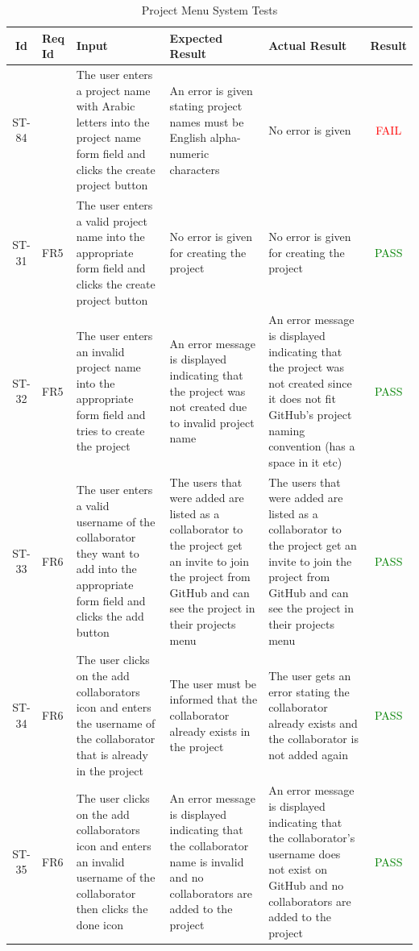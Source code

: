 \documentclass[12pt, titlepage]{article}
\begin{document}
	\begin{center}
		\begin{longtable}{|c|p{1cm}|p{2.7cm}|p{3cm}|p{3cm}|c|}
			\caption{Project Menu System Tests \label{long}}\\
			\hline
			\textbf{Id} & \textbf{Req Id} & \textbf{Input} & \textbf{Expected Result} & \textbf{Actual Result} & \textbf{Result}   \\
			\hline
			ST-84 & & The user enters a project name with Arabic letters into the project name form field and clicks the create project button & An error is given stating project names must be English alpha-numeric characters & No error is given &  \textcolor{red}{FAIL} \\
			\hline
			ST-31 & FR5 & The user enters a valid project name into the appropriate form field and clicks the create project button & No error is given for creating the project & No error is given for creating the project &  \textcolor{green}{PASS} \\
			\hline
			ST-32 & FR5 & The user enters an invalid project name into the appropriate form field and tries to create the project & An error message is displayed indicating that the project was not created due to invalid project name & An error message is displayed indicating that the project was not created since it does not fit GitHub's project naming convention (has a space in it etc) &  \textcolor{green}{PASS} \\
			\hline
			ST-33 & FR6 & The user enters a valid username of the collaborator they want to add into the appropriate form field and clicks the add button & The users that were added are listed as a collaborator to the project get an invite to join the project from GitHub and can see the project in their projects menu & The users that were added are listed as a collaborator to the project get an invite to join the project from GitHub and can see the project in their projects menu & \textcolor{green}{PASS} \\
			\hline
			ST-34 & FR6 &  The user clicks on the add collaborators icon and enters the username of the collaborator that is already in the project & The user must be informed that the collaborator already exists in the project & The user gets an error stating the collaborator already exists and the collaborator is not added again & \textcolor{green}{PASS} \\
			\hline
			ST-35 & FR6 & The user clicks on the add collaborators icon and enters an invalid username of the collaborator then clicks the done icon  & An error message is displayed indicating that the collaborator name is invalid and no collaborators are added to the project & An error message is displayed indicating that the collaborator's username does not exist on GitHub and no collaborators are added to the project & \textcolor{green}{PASS}\\

\end{longtable}
\end{center}
\end{document}
